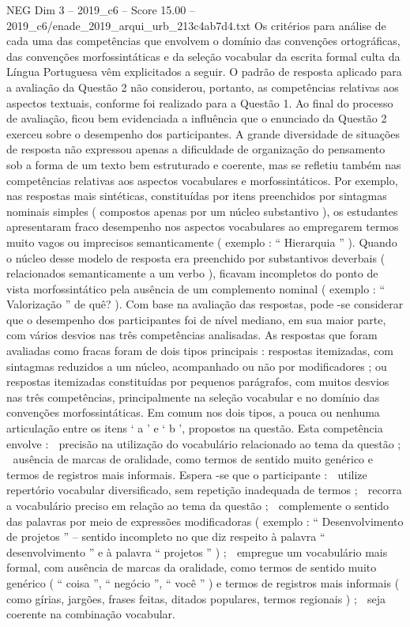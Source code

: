 \begin{textsample}{NEG Dim 3 – 2019\_c6 – Score 15.00 – 2019\_c6/enade\_2019\_arqui\_urb\_213c4ab7d4.txt}
Os critérios para análise de cada uma das competências que envolvem o domínio das convenções ortográficas, das convenções morfossintáticas e da seleção vocabular da escrita formal culta da Língua Portuguesa vêm explicitados a seguir.
O padrão de resposta aplicado para a avaliação da Questão 2 não considerou, portanto, as competências relativas aos aspectos textuais, conforme foi realizado para a Questão 1.
Ao final do processo de avaliação, ficou bem evidenciada a influência que o enunciado da Questão 2 exerceu sobre o desempenho dos participantes.
A grande diversidade de situações de resposta não expressou apenas a dificuldade de organização do pensamento sob a forma de um texto bem estruturado e coerente, mas se refletiu também nas competências relativas aos aspectos vocabulares e morfossintáticos.
Por exemplo, nas respostas mais sintéticas, constituídas por itens preenchidos por sintagmas nominais simples ( compostos apenas por um núcleo substantivo ), os estudantes apresentaram fraco desempenho nos aspectos vocabulares ao empregarem termos muito vagos ou imprecisos semanticamente ( exemplo : “ Hierarquia ” ).
Quando o núcleo desse modelo de resposta era preenchido por substantivos deverbais ( relacionados semanticamente a um verbo ), ficavam incompletos do ponto de vista morfossintático pela ausência de um complemento nominal ( exemplo : “ Valorização ” de quê? ).
Com base na avaliação das respostas, pode -se considerar que o desempenho dos participantes foi de nível mediano, em sua maior parte, com vários desvios nas três competências analisadas.
As respostas que foram avaliadas como fracas foram de dois tipos principais : respostas itemizadas, com sintagmas reduzidos a um núcleo, acompanhado ou não por modificadores ; ou respostas itemizadas constituídas por pequenos parágrafos, com muitos desvios nas três competências, principalmente na seleção vocabular e no domínio das convenções morfossintáticas.
Em comum nos dois tipos, a pouca ou nenhuma articulação entre os itens ‘ a ’ e ‘ b ’, propostos na questão.
Esta competência envolve :  precisão na utilização do vocabulário relacionado ao tema da questão ;  ausência de marcas de oralidade, como termos de sentido muito genérico e termos de registros mais informais.
Espera -se que o participante :  utilize repertório vocabular diversificado, sem repetição inadequada de termos ;  recorra a vocabulário preciso em relação ao tema da questão ;  complemente o sentido das palavras por meio de expressões modificadoras ( exemplo : “ Desenvolvimento de projetos ” – sentido incompleto no que diz respeito à palavra “ desenvolvimento ” e à palavra “ projetos ” ) ;  empregue um vocabulário mais formal, com ausência de marcas da oralidade, como termos de sentido muito genérico ( “ coisa ”, “ negócio ”, “ você ” ) e termos de registros mais informais ( como gírias, jargões, frases feitas, ditados populares, termos regionais ) ;  seja coerente na combinação vocabular.

\end{textsample}
